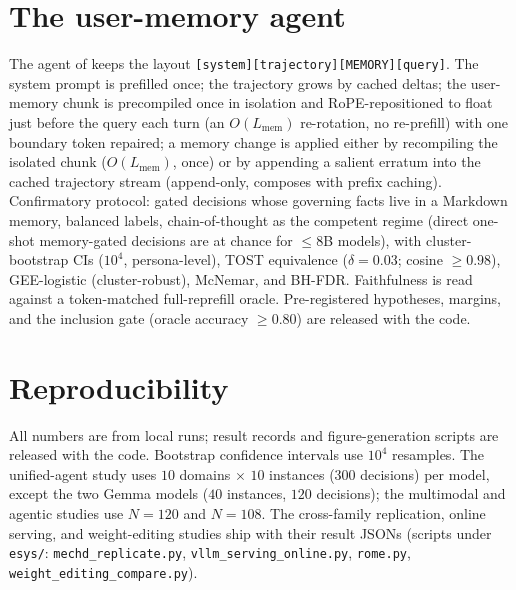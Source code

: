 \section{The user-memory agent}
\label{app:memory-agent}
The agent of  keeps the layout \texttt{[system][trajectory][MEMORY][query]}.
The system prompt is prefilled once; the trajectory grows by cached deltas; the user-memory
chunk is precompiled once in isolation and RoPE-repositioned to float just before the query
each turn (an $O(L_\text{mem})$ re-rotation, no re-prefill) with one boundary token repaired;
a memory change is applied either by recompiling the isolated chunk ($O(L_\text{mem})$, once)
or by appending a salient erratum into the cached trajectory stream (append-only, composes
with prefix caching). Confirmatory protocol: gated decisions whose governing facts live in a
Markdown memory, balanced labels, chain-of-thought as the competent regime (direct one-shot
memory-gated decisions are at chance for $\le$8B models), with cluster-bootstrap CIs
($10^4$, persona-level), TOST equivalence ($\delta{=}0.03$; cosine $\ge0.98$), GEE-logistic
(cluster-robust), McNemar, and BH-FDR. Faithfulness is read against a token-matched
full-reprefill oracle. Pre-registered hypotheses, margins, and the inclusion gate (oracle
accuracy $\ge0.80$) are released with the code.

\section{Reproducibility}
\label{app:repro}
All numbers are from local runs; result records and figure-generation scripts are released with the code.
Bootstrap confidence intervals use $10^4$ resamples. The unified-agent study uses $10$ domains $\times$
$10$ instances ($300$ decisions) per model, except the two Gemma models ($40$ instances, $120$
decisions); the multimodal and agentic studies use $N{=}120$ and $N{=}108$. The
cross-family replication, online serving, and weight-editing studies ship with their result JSONs
(scripts under \texttt{esys/}: \texttt{mechd\_\allowbreak replicate.py},
\texttt{vllm\_serving\_\allowbreak online.py}, \texttt{rome.py},
\texttt{weight\_editing\_\allowbreak compare.py}).
